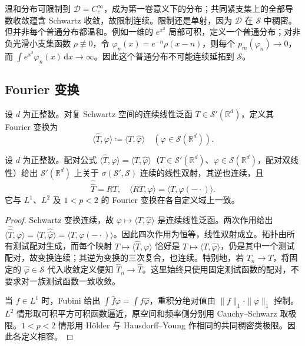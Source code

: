 \ProseParagraphBreak

温和分布可限制到 \(\mathcal D=C_c^\infty\)，成为第一卷意义下的分布；共同紧支集上的全部导数收敛蕴含 Schwartz 收敛，故限制连续。限制还是单射，因为 \(\mathcal D\) 在 \(\mathcal S\) 中稠密。但并非每个普通分布都温和。例如一维的 \(e^{x^2}\) 局部可积，定义一个普通分布；对非负光滑小支集函数 \(\rho\not\equiv0\)，令 \(\varphi_n(x)=e^{-n}\rho(x-n)\)，则每个 \(p_m(\varphi_n)\to0\)，而 \(\int e^{x^2}\varphi_n(x)\,\mathrm{d}x\to\infty\)。因此这个普通分布不可能连续延拓到 \(\mathcal S\)。

\subsection{Fourier 变换}
\label{b2:subsec:050302}

\begin{definition}\label{b2:def:05-distribution-transform}
设 \(d\) 为正整数。对复 Schwartz 空间的连续线性泛函 \(T\in\mathcal S'(\mathbb R^d)\)，定义其 Fourier 变换为
\begin{equation}\label{b2:eq:05-distribution-transform}
 \langle\widehat T,\varphi\rangle\coloneqq\langle T,\widehat\varphi\rangle
 \quad(\varphi\in\mathcal S(\mathbb R^d)).
\end{equation}
\end{definition}

\begin{theorem}\label{b2:thm:05-distribution-automorphism}
设 \(d\) 为正整数。配对公式 \(\langle\widehat T,\varphi\rangle=\langle T,\widehat\varphi\rangle\)（\(T\in\mathcal S'(\mathbb R^d)\)、\(\varphi\in\mathcal S(\mathbb R^d)\)，配对双线性）给出 \(\mathcal S'(\mathbb R^d)\) 上关于 \(\sigma(\mathcal S',\mathcal S)\) 连续的线性双射，其逆也连续，且
\[
 \widehat{\widehat T}=RT,\quad
 \langle RT,\varphi\rangle=\langle T,\varphi(-\cdot)\rangle.
\]
它与 \(L^1\)、\(L^2\) 及 \(1<p<2\) 的 Fourier 变换在各自定义域上一致。
\end{theorem}
\begin{proof}
Schwartz 变换连续，故 \(\varphi\mapsto\langle T,\widehat\varphi\rangle\) 是连续线性泛函。两次作用给出 \(\langle\widehat{\widehat T},\varphi\rangle=\langle T,\widehat{\widehat\varphi}\rangle=\langle T,\varphi(-\cdot)\rangle\)。因此四次作用为恒等，线性双射成立。\WeakStar{}拓扑由所有测试配对生成，而每个映射 \(T\mapsto\langle\widehat T,\varphi\rangle\) 恰好是 \(T\mapsto\langle T,\widehat\varphi\rangle\)，仍是其中一个测试配对，故变换连续；其逆为变换的三次复合，也连续。特别地，若 \(T_n\to T\)，将固定的 \(\widehat\varphi\in\mathcal S\) 代入收敛定义便知 \(\widehat T_n\to\widehat T\)。这里始终只使用固定测试函数的配对，不要求对一族测试函数一致收敛。

当 \(f\in L^1\) 时，Fubini 给出 \(\int\widehat f\varphi=\int f\widehat\varphi\)，重积分绝对值由 \(\|f\|_1\cdot\|\varphi\|_1\) 控制。\(L^2\) 情形取可积平方可积函数逼近，原空间和频率侧分别用 Cauchy--Schwarz 取极限。\(1<p<2\) 情形用 Hölder 与 Hausdorff--Young 作相同的共同稠密类极限。因此各定义相容。
\end{proof}

